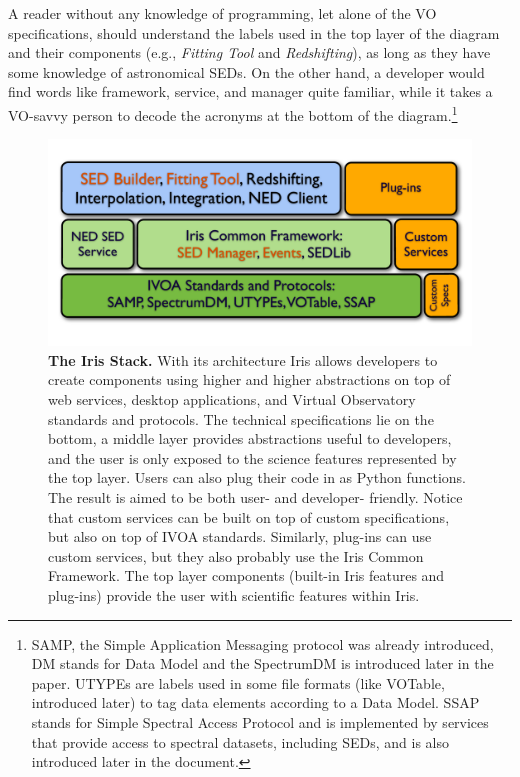 \documentclass[preprint,authoryear,5p]{elsarticle}
\begin{document}
A reader without any knowledge of programming, let alone of the VO
specifications, should understand the labels used in the top layer of the
diagram and their components (e.g., \textit{Fitting Tool} and \textit{Redshifting}), as long as they
have some knowledge of astronomical SEDs. On the other hand, a developer would
find words like framework, service, and manager quite familiar, while it takes a
VO-savvy person to decode the acronyms at the bottom of the diagram.\footnote{SAMP,
the Simple Application Messaging protocol was already introduced, DM stands for Data Model and the SpectrumDM
is introduced later in the paper. UTYPEs are labels used in some file formats (like VOTable, introduced later)
to tag data elements according to a Data Model. SSAP stands for Simple Spectral Access Protocol and
is implemented by services that provide access to spectral datasets, including SEDs, and is also introduced later
in the document.}

\begin{figure}
\begin{center}
\includegraphics[width=1.0\columnwidth]{IrisStack.pdf} \caption{\textbf{The
Iris Stack.}  With its architecture Iris allows developers to create components
using higher and higher abstractions on top of web services, desktop
applications, and Virtual Observatory standards and protocols.
The technical
specifications lie on the bottom, a middle layer provides abstractions useful to
developers, and the user is only exposed to the science features represented by the top layer.
Users can also
plug their code in as Python functions. The result is aimed to be both user- and
developer- friendly. Notice that custom services can be built on top of custom specifications,
but also on top of IVOA standards. Similarly, plug-ins can use custom services, but they also
probably use the Iris Common Framework. The top layer components
(built-in Iris features and plug-ins) provide the user with scientific features within Iris.}
\label{fig:stack}
\end{center}
\end{figure}
\end{document}
